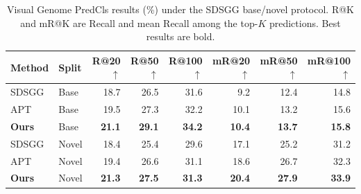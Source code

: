 \begin{table}[t]
\centering
\caption{Visual Genome PredCls results (\%) under the SDSGG base/novel
protocol. R@K and mR@K are Recall and mean Recall among the top-$K$
predictions. Best results are bold.}
\label{tab:main_comparison}
\small
\setlength{\tabcolsep}{5.2pt}
\begin{tabular}{llrrrrrr}
\toprule
Method & Split & R@20$\uparrow$ & R@50$\uparrow$ & R@100$\uparrow$ & mR@20$\uparrow$ & mR@50$\uparrow$ & mR@100$\uparrow$ \\
\midrule
SDSGG \cite{chen2024sdsgg} & Base & 18.7 & 26.5 & 31.6 & 9.2 & 12.4 & 14.8 \\
APT \cite{luo2026apt} & Base & 19.5 & 27.3 & 32.2 & 10.1 & 13.2 & 15.6 \\
\rowcolor{blue!6}\textbf{Ours} & Base & \textbf{21.1} & \textbf{29.1} & \textbf{34.2} & \textbf{10.4} & \textbf{13.7} & \textbf{15.8} \\
\midrule
SDSGG \cite{chen2024sdsgg} & Novel & 18.4 & 25.4 & 29.6 & 17.1 & 25.2 & 31.2 \\
APT \cite{luo2026apt} & Novel & 19.4 & 26.6 & 31.1 & 18.6 & 26.7 & 32.3 \\
\rowcolor{blue!6}\textbf{Ours} & Novel & \textbf{21.3} & \textbf{27.5} & \textbf{31.3} & \textbf{20.4} & \textbf{27.9} & \textbf{33.9} \\
\bottomrule
\end{tabular}
\end{table}
